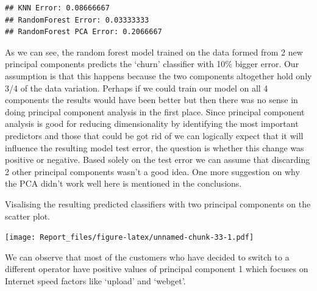 \documentclass[
]{article}
\newenvironment{Shaded}{\begin{snugshade}}{\end{snugshade}}
\newcommand{\DataTypeTok}[1]{\textcolor[rgb]{0.13,0.29,0.53}{#1}}
\newcommand{\DecValTok}[1]{\textcolor[rgb]{0.00,0.00,0.81}{#1}}
\newcommand{\FloatTok}[1]{\textcolor[rgb]{0.00,0.00,0.81}{#1}}
\newcommand{\KeywordTok}[1]{\textcolor[rgb]{0.13,0.29,0.53}{\textbf{#1}}}
\newcommand{\NormalTok}[1]{#1}
\newcommand{\OperatorTok}[1]{\textcolor[rgb]{0.81,0.36,0.00}{\textbf{#1}}}
\newcommand{\StringTok}[1]{\textcolor[rgb]{0.31,0.60,0.02}{#1}}
\begin{document}
\begin{verbatim}
## KNN Error: 0.08666667 
## RandomForest Error: 0.03333333 
## RandomForest PCA Error: 0.2066667
\end{verbatim}

As we can see, the random forest model trained on the data formed from 2
new principal components predicts the `churn' classifier with 10\%
bigger error. Our assumption is that this happens because the two
components altogether hold only 3/4 of the data variation. Perhaps if we
could train our model on all 4 components the results would have been
better but then there was no sense in doing principal component analysis
in the first place. Since principal component analysis is good for
reducing dimensionality by identifying the most important predictors and
those that could be got rid of we can logically expect that it will
influence the resulting model test error, the question is whether this
change was positive or negative. Based solely on the test error we can
assume that discarding 2 other principal components wasn't a good idea.
One more suggestion on why the PCA didn't work well here is mentioned in
the conclusions.

Visalising the resulting predicted classifiers with two principal
components on the scatter plot.

\begin{Shaded}
\end{Shaded}

\texttt{[image: Report\_files/figure-latex/unnamed-chunk-33-1.pdf]}

We can observe that most of the customers who have decided to switch to
a different operator have positive values of principal component 1 which
focuses on Internet speed factors like `upload' and `webget'.
\end{document}
